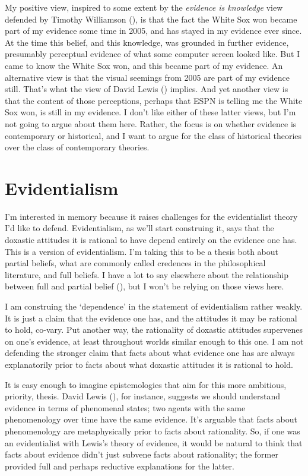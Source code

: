\documentclass[
  11pt,
  letterpaper,
  DIV=11,
  numbers=noendperiod,
  twoside]{scrartcl}
\begin{document}
My positive view, inspired to some extent by the \emph{evidence is
knowledge} view defended by Timothy Williamson
(), is that the fact the White Sox
won became part of my evidence some time in 2005, and has stayed in my
evidence ever since. At the time this belief, and this knowledge, was
grounded in further evidence, presumably perceptual evidence of what
some computer screen looked like. But I came to know the White Sox won,
and this became part of my evidence. An alternative view is that the
visual seemings from 2005 are part of my evidence still. That's what the
view of David Lewis () implies. And yet
another view is that the content of those perceptions, perhaps that ESPN
is telling me the White Sox won, is still in my evidence. I don't like
either of these latter views, but I'm not going to argue about them
here. Rather, the focus is on whether evidence is contemporary or
historical, and I want to argue for the class of historical theories
over the class of contemporary theories.

\section{Evidentialism}\label{evidentialism}

I'm interested in memory because it raises challenges for the
evidentialist theory I'd like to defend. Evidentialism, as we'll start
construing it, says that the doxastic attitudes it is rational to have
depend entirely on the evidence one has. This is a version of
evidentialism. I'm taking this to be a thesis both about partial
beliefs, what are commonly called credences in the philosophical
literature, and full beliefs. I have a lot to say elsewhere about the
relationship between full and partial belief
(), but I won't be relying
on those views here.

I am construing the `dependence' in the statement of evidentialism
rather weakly. It is just a claim that the evidence one has, and the
attitudes it may be rational to hold, co-vary. Put another way, the
rationality of doxastic attitudes supervenes on one's evidence, at least
throughout worlds similar enough to this one. I am not defending the
stronger claim that facts about what evidence one has are always
explanatorily prior to facts about what doxastic attitudes it is
rational to hold.

It is easy enough to imagine epistemologies that aim for this more
ambitious, priority, thesis. David Lewis
(), for instance, suggests we should
understand evidence in terms of phenomenal states; two agents with the
same phenomenology over time have the same evidence. It's arguable that
facts about phenomenology are metaphysically prior to facts about
rationality. So, if one was an evidentialist with Lewis's theory of
evidence, it would be natural to think that facts about evidence didn't
just subvene facts about rationality; the former provided full and
perhaps reductive explanations for the latter.
\end{document}
